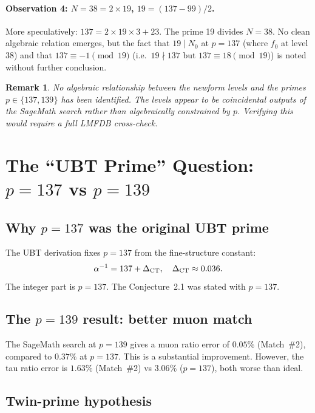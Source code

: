 \documentclass[12pt,a4paper]{article}
\newtheorem{remark}{Remark}
\begin{document}
\paragraph{Observation 4: $N = 38 = 2 \times 19$, $19 = (137-99)/2$.}
More speculatively: $137 = 2 \times 19 \times 3 + 23$.  The prime 19
divides $N=38$.  No clean algebraic relation emerges, but the fact that
$19 \mid N_0$ at $p=137$ (where $f_0$ at level 38) and that $137 \equiv
-1 \pmod{19}$ (i.e.\ $19 \nmid 137$ but $137 \equiv 18 \pmod{19}$) is
noted without further conclusion.

\begin{remark}
No algebraic relationship between the newform levels and the primes
$p \in \{137, 139\}$ has been identified.  The levels appear to be
coincidental outputs of the SageMath search rather than algebraically
constrained by $p$.  Verifying this would require a full LMFDB cross-check.
\end{remark}

\section{The ``UBT Prime'' Question: \texorpdfstring{$p=137$}{p=137} vs
  \texorpdfstring{$p=139$}{p=139}}

\subsection{Why \texorpdfstring{$p=137$}{p=137} was the original UBT prime}

The UBT derivation fixes $p = 137$ from the fine-structure constant:
\[
  \alpha^{-1} = 137 + \Delta_{\rm CT}, \quad \Delta_{\rm CT} \approx 0.036.
\]
The integer part is $p = 137$.  The Conjecture~2.1 was stated with $p=137$.

\subsection{The \texorpdfstring{$p=139$}{p=139} result: better muon match}

The SageMath search at $p=139$ gives a muon ratio error of $0.05\%$
(Match~\#2), compared to $0.37\%$ at $p=137$.  This is a substantial
improvement.  However, the tau ratio error is $1.63\%$ (Match~\#2) vs
$3.06\%$ ($p=137$), both worse than ideal.

\subsection{Twin-prime hypothesis}
\end{document}
